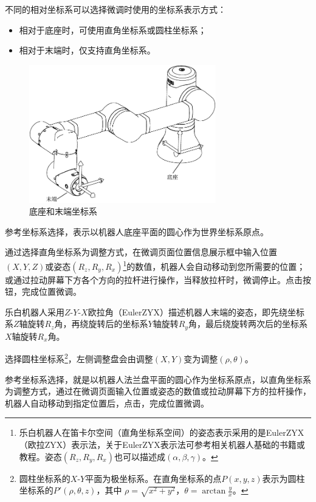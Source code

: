 不同的相对坐标系可以选择微调时使用的坐标系表示方式：
\begin{itemize}
	\item 相对于底座时，可使用直角坐标系或圆柱坐标系；
	\item 相对于末端时，仅支持直角坐标系。
\end{itemize}

\begin{figure}[ht]
	\centering
	\includegraphics[height=6cm]{line_graphs/fine_tuning_coordinate.pdf}
	\caption{底座和末端坐标系}
	\label{fig:坐标空间示意图}
\end{figure}

参考坐标系选择，表示以机器人底座平面的圆心作为世界坐标系原点。

通过选择直角坐标系为调整方式，在微调页面位置信息展示框中输入位置$(X, Y, Z)$或姿态$(R_z, R_y, R_x)$\footnote{乐白机器人在笛卡尔空间（直角坐标系空间）的姿态表示采用的是EulerZYX（欧拉ZYX）表示法，关于EulerZYX表示法可参考相关机器人基础的书籍或教程。姿态$(R_z, R_y, R_x)$也可以描述成$(\alpha, \beta, \gamma)$。}的数值，机器人会自动移动到您所需要的位置；或通过拉动屏幕下方各个方向的拉杆进行操作，当释放拉杆时，微调停止。点击按钮，完成位置微调。

乐白机器人采用$Z\textrm{-}Y\textrm{-}X$欧拉角（EulerZYX）描述机器人末端的姿态，即先绕坐标系$Z$轴旋转$R_z$角，再绕旋转后的坐标系$Y$轴旋转$R_y$角，最后绕旋转两次后的坐标系$X$轴旋转$R_x$角。

选择圆柱坐标系\footnote{圆柱坐标系的$X\textrm{-}Y$平面为极坐标系。在直角坐标系的点$P(x, y, z)$表示为圆柱坐标系的$P'(\rho, \theta, z)$，其中 $\rho=\sqrt{x^2+y^2}$，$\theta=\arctan\frac{y}{x}$。}，左侧调整盘会由调整$(X, Y)$变为调整$(\rho, \theta)$。

参考坐标系选择，就是以机器人法兰盘平面的圆心作为坐标系原点，以直角坐标系为调整方式，通过在微调页面输入位置或姿态的数值或拉动屏幕下方的拉杆操作，机器人自动移动到指定位置后，点击，完成位置微调。


